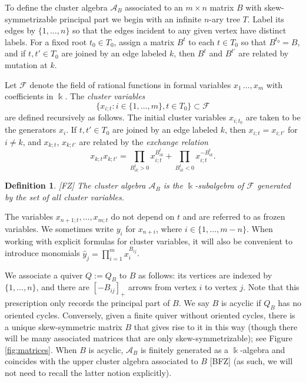 \documentclass[12pt]{amsart}
\newcommand{\sayHW}[1]{\say[HW]{\color{violet}{\bf HW:}\;#1}}
\newcommand{\sayDR}[1]{\say[DR]{\color{red}{\bf DR:}\;#1}}
\newcommand{\cA}{\mathcal{A}}
\newcommand{\kk}{\Bbbk}%
\newcommand{\cF}{\mathcal{F}}
\newtheorem{definition}[theorem]{Definition}
\theoremstyle{remark}
\numberwithin{equation}{section}
\begin{document}
To define the cluster algebra $\cA_B$ associated to an $m \times n$ matrix $B$ with skew-symmetrizable principal part we begin with an infinite $n$-ary tree  $T$. 
Label its edges by $\{1,\dotsc,n\}$ so that the edges incident to any given vertex have distinct labels. 
For a fixed root $t_0 \in T_0$, assign a matrix $B^t$ to each $t \in T_0$ so that $B^{t_0} = B$, and if $t, t' \in T_0$ are joined by an edge labeled $k$, then $B^t$ and $B^{t'}$ are related by mutation at $k$. 

Let $\cF$ denote the field of rational functions in formal variables $x_{1}\,\dotsc,x_{m}$ with coefficients in $\kk$. The \emph{cluster variables} $$\{ x_{i;t}: i \in \{1,\dotsc,m\}, t \in T_0\} \subset \cF$$ are defined recursively as follows. The initial cluster variables $x_{i;t_0}$ are taken to be the generators $x_i$. If $t,t' \in T_0$ are joined by an edge labeled $k$, then $x_{i;t} = x_{i;t'}$ for $i \neq k$, and $x_{k;t}$, $x_{k;t'}$ are related by the \emph{exchange relation} 
\[
x_{k;t}x_{k;t'} = \prod_{B^t_{ik}>0}x_{i;t}^{B^t_{ik}} + \prod_{B^t_{ik}<0}x_{i;t}^{-B^t_{ik}}.
\]

\begin{definition}
\emph{[FZ]} The cluster algebra $\cA_B$ is the $\kk$-subalgebra of $\cF$ generated by the set of all cluster variables.
\end{definition}

The variables $x_{n+1;t},\dotsc, x_{m;t}$ do not depend on $t$ and are referred to as frozen variables. 
We sometimes write $y_i$\sayDR{Do we need the notation $y_i$?} for $x_{n+i}$, where $i \in \{1,\dotsc, m-n\}$. 
When working with explicit formulas for cluster variables, it will also be convenient to introduce monomials $\hat{y}_j = \prod\limits_{i=1}^m x_i^{B_{ij}}$. 

We associate a quiver $Q := Q_B$ to $B$ as follows: its vertices are indexed by $\{1,\dotsc,n\}$, and there are $[-B_{ij}]_+$ arrows from vertex $i$ to vertex $j$. 
Note that this prescription only records the principal part of $B$. 
We say $B$ is acyclic if $Q_B$ has no oriented cycles. 
Conversely, given a finite quiver without oriented cycles, there is a unique skew-symmetric matrix $B$ that gives rise to it in this way (though there will be many associated matrices that are only skew-symmetrizable); see Figure \ref{fig:matrices}. 
When $B$ is acyclic, $\cA_B$ is finitely generated as a $\kk$-algebra and %
coincides with the upper cluster algebra associated to $B$ [BFZ] (as such, we will not need to recall the latter notion explicitly).
\end{document}
